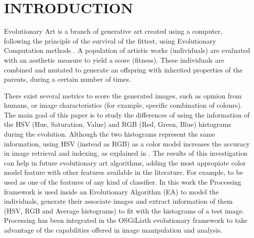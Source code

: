 \documentclass[a4paper,twoside]{article}
\begin{document}
\onecolumn \maketitle \normalsize \vfill

\section{\uppercase{Introduction}}
\noindent Evolutionary Art \cite{EART} is a branch of generative art \cite{PHEROGRAPHY} created using a
computer, following the principle of the survival of the fittest, %
using Evolutionary Computation methods \cite{INTROEIBEN}. A population
of artistic works (individuals) are evaluated with an aesthetic
measure to yield a score (fitness). These individuals are combined and
mutated to generate an offspring with inherited properties of the
parents, during a certain number of times. 

There exist several metrics to score the generated images, such as opinion from humans, or image characteristics (for example, specific combination of colours). The main goal of this paper is to study the differences of using
the information of the HSV (Hue, Saturation, Value) and RGB (Red,
Green, Blue) histograms during the evolution. Although the two histograms represent the same information, using HSV (instead as RGB) as a color model increases the accuracy in image retrieval and indexing, as explained in \cite{COLORDIFFERENCES}. The results of this investigation can help in future evolutionary art algorithms, adding the most appropiate color model feature with other features available in the literature. For example, to be used as one of the features of any kind of classifier.
In this work the Processing \cite{PROCESSING} framework is used inside an Evolutionary Algorithm (EA) to model the
individuals, generate their associate images and extract information
of them (HSV, RGB and Average histograms) to fit with the histograms
of a test image. Processing has been integrated in the OSGiLiath \cite{OSGILIATH} 
evolutionary framework to take advantage of the capabilities offered in image manipulation and analysis.
\end{document}
